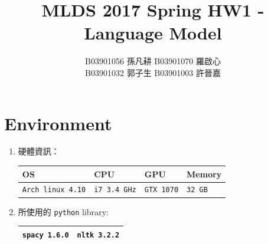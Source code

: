 \documentclass[12pt, a4paper]{article}
\title{MLDS 2017 Spring HW1 - Language Model}
\author{B03901056 孫凡耕 B03901070 羅啟心\\
        B03901032 郭子生 B03901003 許晉嘉}
\date{\vspace{-5ex}}
\theoremstyle{mystyle}	%
\begin{document}
\maketitle 
{}%
\thispagestyle{empty}
\section{Environment}
\begin{enumerate}
  \item 硬體資訊： 
    \begin{tabular}{|C{4cm}|C{3cm}|C{3cm}|C{3cm}|}
      \hline
      OS & CPU & GPU & Memory \\
      \hline
      \texttt{Arch linux 4.10} & \texttt{i7 3.4 GHz} &
      \texttt{GTX 1070}  & \texttt{32 GB}  \\
      \hline
    \end{tabular}
  \item 所使用的 \texttt{python} library:
    \begin{tabular}{|c|c|}
      \hline
      \texttt{spacy 1.6.0} & \texttt{nltk 3.2.2} \\
      \hline
    \end{tabular}
\end{enumerate}
\end{document}
